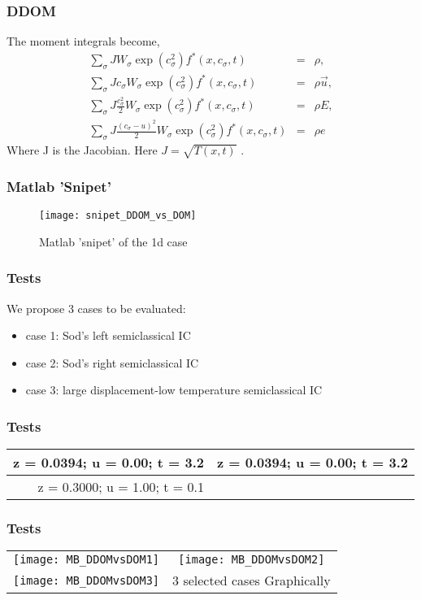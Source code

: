 \documentclass[11pt,fleqn]{beamer}
\begin{document}
\begin{frame}
	\frametitle{DDOM}
	The moment integrals become,
	\begin{eqnarray}
		\sum_\sigma J W_\sigma \exp(c_\sigma^2) f^*(x,c_\sigma,t) &=&  \rho, \\
		\sum_\sigma J c_\sigma W_\sigma \exp(c_\sigma^2) f^*(x,c_\sigma,t) &=& \rho \vec{u}, \nonumber \\
		\sum_\sigma J \frac{c_\sigma^2}{2} W_\sigma \exp(c_\sigma^2) f^*(x,c_\sigma,t) &=& \rho E, \nonumber \\
		\sum_\sigma J \frac{(c_\sigma-u)^2}{2} W_\sigma \exp(c_\sigma^2) f^*(x,c_\sigma,t) &=& \rho e  \nonumber
	\end{eqnarray}
	Where J is the Jacobian. Here $J = \sqrt{T(x,t)}$ .
\end{frame}

\begin{frame}
	\frametitle{Matlab 'Snipet'}
	\begin{figure}
	\centering
	\texttt{[image: snipet\_DDOM\_vs\_DOM]}%
	\caption{Matlab 'snipet' of the 1d case}
	\end{figure}	
\end{frame}

\begin{frame}
	\frametitle{Tests}
	We propose 3 cases to be evaluated:
	\begin{itemize}
	\item case 1: Sod's left semiclassical IC
	\item case 2: Sod's right semiclassical IC
	\item case 3: large displacement-low temperature semiclassical IC
	\end{itemize}
\end{frame}

\begin{frame}
	\frametitle{Tests}
	\centering
	\begin{tabular}{r | c}
	z = 0.0394; u = 0.00; t = 3.2 &  z = 0.0394; u = 0.00; t = 3.2 \\ \hline
	z = 0.3000; u = 1.00; t = 0.1 & \\
	\end{tabular}
\end{frame}

\begin{frame}
	\frametitle{Tests}
	\begin{tabular}{r c}
	\centering
	\texttt{[image: MB\_DDOMvsDOM1]} & \texttt{[image: MB\_DDOMvsDOM2]} \\ 
	\texttt{[image: MB\_DDOMvsDOM3]} & {3 selected cases Graphically}\\
	\end{tabular}
\end{frame}
\end{document}
